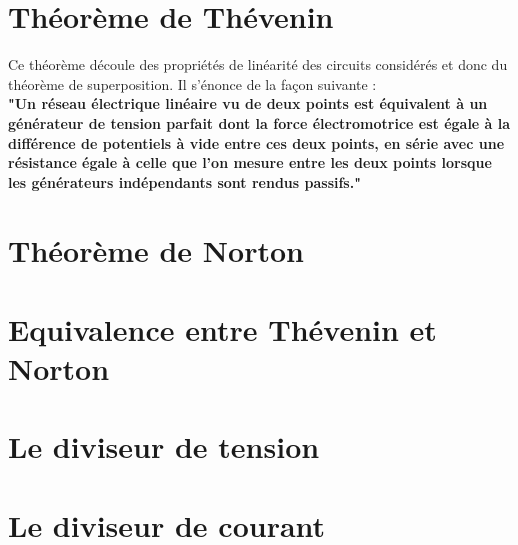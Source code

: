 \section{Théorème de Thévenin}

Ce théorème découle des propriétés de linéarité des circuits considérés et donc du théorème de superposition. Il s'énonce de la façon suivante : \\

\textbf{"Un réseau électrique linéaire vu de deux points est équivalent à un générateur de tension parfait dont la force électromotrice est égale à la différence de potentiels à vide entre ces deux points, en série avec une résistance égale à celle que l'on mesure entre les deux points lorsque les générateurs indépendants sont rendus passifs."}



\section{Théorème de Norton}

\section{Equivalence entre Thévenin et Norton}
\section{Le diviseur de tension}
\section{Le diviseur de courant}
